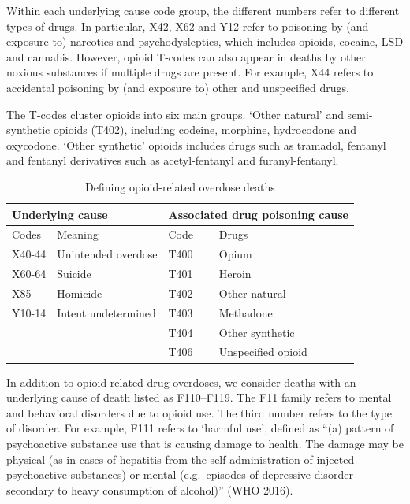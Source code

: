 \documentclass[12pt, a4paper]{article}
\begin{document}
Within each underlying cause code group, the different numbers refer to different types of drugs. In particular, X42, X62 and Y12 refer to poisoning by (and exposure to) narcotics and psychodysleptics, which includes opioids, cocaine, LSD and cannabis. However, opioid T-codes can also appear in deaths by other noxious substances if multiple drugs are present. For example, X44 refers to accidental poisoning by (and exposure to) other and unspecified drugs. 

The T-codes cluster opioids into six main groups. `Other natural' and semi-synthetic opioids (T402), including codeine, morphine, hydrocodone and oxycodone. `Other synthetic' opioids includes drugs such as tramadol, fentanyl and fentanyl derivatives such as acetyl-fentanyl and furanyl-fentanyl. %

\begin{table}[h!]
\centering
\caption{Defining opioid-related overdose deaths}

\begin{tabular}{ll|ll}
\multicolumn{2}{l|}{Underlying cause} & \multicolumn{2}{l}{Associated drug poisoning cause} \\ \hline
Codes      & Meaning                 & Code               & Drugs                           \\ \hline
X40-44     & Unintended overdose     & T400               & Opium                           \\
X60-64     & Suicide                 & T401               & Heroin                          \\
X85        & Homicide                & T402               & Other natural                   \\
Y10-14     & Intent undetermined     & T403               & Methadone                       \\
           &                         & T404               & Other synthetic                 \\
           &                         & T406               & Unspecified opioid             
\end{tabular}
\label{overdose-codes}
\end{table}

In addition to opioid-related drug overdoses, we consider deaths with an underlying cause of death listed as F110--F119. The F11 family refers to mental and behavioral disorders due to opioid use. The third number refers to the type of disorder. For example, F111 refers to `harmful use', defined as ``(a) pattern of psychoactive substance use that is causing damage to health. The damage may be physical (as in cases of hepatitis from the self-administration of injected psychoactive substances) or mental (e.g.\ episodes of depressive disorder secondary to heavy consumption of alcohol)'' (WHO 2016).
\end{document}
